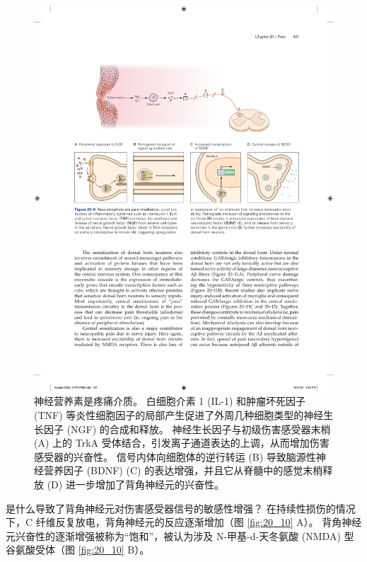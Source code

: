 \begin{figure}[htbp]
	\centering
	\includegraphics[width=0.7\linewidth]{chap20/fig_20_9}
	\caption{神经营养素是疼痛介质。 
		白细胞介素 1 (IL-1) 和肿瘤坏死因子 (TNF) 等炎性细胞因子的局部产生促进了外周几种细胞类型的神经生长因子 (NGF) 的合成和释放。 
		神经生长因子与初级伤害感受器末梢 (A) 上的 TrkA 受体结合，引发离子通道表达的上调，从而增加伤害感受器的兴奋性。 
		信号内体向细胞体的逆行转运 (B) 导致脑源性神经营养因子 (BDNF) (C) 的表达增强，并且它从脊髓中的感觉末梢释放 (D) 进一步增加了背角神经元的兴奋性。}
	\label{fig:20_9}
\end{figure}

是什么导致了背角神经元对伤害感受器信号的敏感性增强？ 
在持续性损伤的情况下，C 纤维反复放电，背角神经元的反应逐渐增加（图 \ref{fig:20_10} A）。 
背角神经元兴奋性的逐渐增强被称为“饱和”，被认为涉及 N-甲基-d-天冬氨酸 (NMDA) 型谷氨酸受体（图 \ref{fig:20_10} B）。

